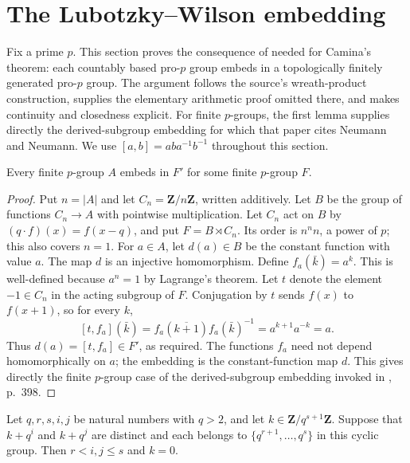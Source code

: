\section{The Lubotzky--Wilson embedding}

Fix a prime $p$. This section proves the consequence of
\cite{LubotzkyWilson1984} needed for Camina's theorem: each countably
based pro-$p$ group embeds in a topologically finitely generated
pro-$p$ group. The argument follows the source's wreath-product
construction, supplies the elementary arithmetic proof omitted there,
and makes continuity and closedness explicit. For finite $p$-groups,
the first lemma supplies directly the derived-subgroup embedding for
which that paper cites Neumann and Neumann. We use
$[a,b]=aba^{-1}b^{-1}$ throughout this section.

\begin{lemma}
\label{lem:finite-p-derived-embedding}
\leanok
Every finite $p$-group $A$ embeds in $F'$ for some finite $p$-group $F$.
\end{lemma}

\begin{proof}
Put $n=|A|$ and let $C_n=\mathbf Z/n\mathbf Z$, written additively.
Let $B$ be the group of functions $C_n\to A$ with pointwise
multiplication. Let $C_n$ act on $B$ by
$(q\cdot f)(x)=f(x-q)$, and put $F=B\rtimes C_n$.
Its order is $n^n n$, a power of $p$; this also covers $n=1$.
For $a\in A$, let $d(a)\in B$ be the constant function with value $a$.
The map $d$ is an injective homomorphism. Define $f_a(\bar k)=a^k$.
This is well-defined because $a^n=1$ by Lagrange's theorem.
Let $t$ denote the element $-1\in C_n$ in the acting subgroup
of $F$. Conjugation by $t$ sends $f(x)$ to $f(x+1)$, so for every $k$,
\[
 [t,f_a](\bar k)=f_a(\overline{k+1})f_a(\bar k)^{-1}
             =a^{k+1}a^{-k}=a.
\]
Thus $d(a)=[t,f_a]\in F'$, as required. The functions $f_a$
need not depend homomorphically on $a$; the embedding is the
constant-function map $d$.
This gives directly the finite $p$-group case of the
derived-subgroup embedding invoked in \cite{LubotzkyWilson1984}, p.~398.
\end{proof}

\begin{lemma}
\label{lem:sparse-powers-separation}
\leanok
Let $q,r,s,i,j$ be natural numbers with $q>2$, and let
$k\in\mathbf Z/q^{s+1}\mathbf Z$. Suppose that $k+q^i$ and
$k+q^j$ are distinct and each belongs to
$\{q^{r+1},\ldots,q^s\}$ in this cyclic group.
Then $r<i,j\le s$ and $k=0$.
\end{lemma}

